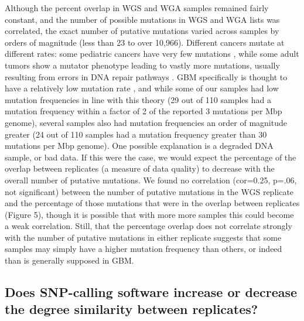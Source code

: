 \documentclass[11pt]{article} %
\begin{document}
Although the percent overlap in WGS and WGA samples remained fairly constant, and the number of possible mutations in WGS and WGA lists was correlated, the exact number of putative mutations varied across samples by orders of magnitude (less than 23 to over 10,966). Different cancers mutate at different rates: some pediatric cancers have very few mutations \citep{RB2hit, pediatric}, while some adult tumors show a mutator phenotype leading to vastly more mutations, usually resulting from errors in DNA repair pathways \citep{mutator}. GBM specifically is thought to have a relatively low mutation rate \citep{Parsons, TCGA-GBM-13}, and while some of our samples had low mutation frequencies in line with this theory (29 out of 110 samples had a mutation frequency within a factor of 2 of the reported 3 mutations per Mbp genome), several samples also had mutation frequencies an order of magnitude greater (24 out of 110 samples had a mutation frequency greater than 30 mutations per Mbp genome). One possible explanation is a degraded DNA sample, or bad data. If this were the case, we would expect the percentage of the overlap between replicates (a measure of data quality) to decrease with the overall number of putative mutations. We found no correlation (cor=0.25, p=.06, not significant) between the number of putative mutations in the WGS replicate and the percentage of those mutations that were in the overlap between replicates (Figure 5), though it is possible that with more more samples this could become a weak correlation. Still, that the percentage overlap does not correlate strongly with the number of putative mutations in either replicate suggests that some samples may simply have a higher mutation frequency than others, or indeed than is generally supposed in GBM.

\subsection*{Does SNP-calling software increase or decrease the degree similarity between replicates?}
\end{document}
